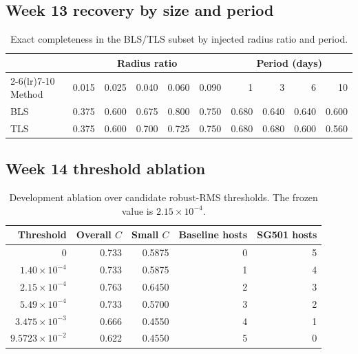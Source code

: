 \documentclass[11pt]{article}
\begin{document}
\subsection{Week 13 recovery by size and period}
\begin{table}[htbp]
\centering
\caption{Exact completeness in the BLS/TLS subset by injected radius ratio and period.}
\small
\begin{tabular}{lrrrrrrrrr}
\toprule
& \multicolumn{5}{c}{Radius ratio} & \multicolumn{4}{c}{Period (days)}\\
\cmidrule(lr){2-6}\cmidrule(lr){7-10}
Method & 0.015 & 0.025 & 0.040 & 0.060 & 0.090 & 1 & 3 & 6 & 10\\
\midrule
BLS & 0.375 & 0.600 & 0.675 & 0.800 & 0.750 & 0.680 & 0.640 & 0.640 & 0.600\\
TLS & 0.375 & 0.600 & 0.700 & 0.725 & 0.750 & 0.680 & 0.680 & 0.600 & 0.560\\
\bottomrule
\end{tabular}
\end{table}

\subsection{Week 14 threshold ablation}
\begin{table}[htbp]
\centering
\caption{Development ablation over candidate robust-RMS thresholds. The frozen value is $2.15\times10^{-4}$.}
\small
\begin{tabular}{rrrrr}
\toprule
Threshold & Overall $C$ & Small $C$ & Baseline hosts & SG501 hosts\\
\midrule
0            & 0.733 & 0.5875 & 0 & 5\\
$1.40\times10^{-4}$ & 0.733 & 0.5875 & 1 & 4\\
$2.15\times10^{-4}$ & 0.763 & 0.6450 & 2 & 3\\
$5.49\times10^{-4}$ & 0.733 & 0.5700 & 3 & 2\\
$3.475\times10^{-3}$ & 0.666 & 0.4550 & 4 & 1\\
$9.5723\times10^{-2}$ & 0.622 & 0.4550 & 5 & 0\\
\bottomrule
\end{tabular}
\end{table}
\end{document}
